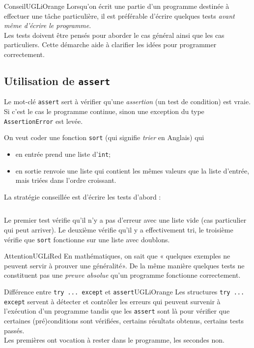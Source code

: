 \documentclass[a4paper,10pt,cours]{nsi}
\newcommand{\file}[1]{\inputminted{python}{#1}}
\begin{document}
\begin{encadrecolore}{Conseil}{UGLiOrange}
    Lorsqu'on écrit une partie d'un programme destinée à effectuer une tâche particulière, il est préférable d'écrire quelques tests \textit{avant même d'écrire le programme}.\\
    Les tests doivent être pensés pour aborder le cas général ainsi que les cas particuliers. Cette démarche aide à clarifier les idées pour programmer correctement.
\end{encadrecolore}

\subsection{Utilisation de \texttt{assert}}

Le mot-clé \texttt{assert} sert à vérifier qu'une \textit{assertion} (un test de condition) est vraie. Si c'est le cas le programme continue, sinon une exception du type \texttt{AssertionError} est levée.

On veut coder une fonction \texttt{sort} (qui signifie \textit{trier} en Anglais) qui 
\begin{itemize}
    \item   en entrée prend une liste d'\texttt{int};
    \item   en sortie renvoie une liste qui contient les mêmes valeurs que la liste d'entrée, mais triées dans l'ordre croissant.
\end{itemize}

La stratégie conseillée est d'écrire les tests d'abord :
\begin{pyc}
\file{scripts/assert2.py}
\end{pyc}
Le premier test vérifie qu'il n'y a pas d'erreur avec une liste vide (cas particulier qui peut arriver). Le deuxième vérifie qu'il y a effectivement tri, le troisième vérifie que \texttt{sort} fonctionne sur une liste avec doublons.

\begin{encadrecolore}{Attention}{UGLiRed}
    En mathématiques, on sait que « quelques exemples ne peuvent servir à prouver une généralité». De la même manière quelques tests ne constituent pas une \textit{preuve absolue} qu'un programme fonctionne correctement.
\end{encadrecolore}


\begin{encadrecolore}{Différence entre \texttt{try ... except} et \texttt{assert}}{UGLiOrange}
    Les structures \texttt{try ... except} servent à détecter et contrôler les erreurs qui peuvent survenir à l'exécution d'un programme tandis que les \texttt{assert} sont là pour vérifier que certaines (pré)conditions sont vérifiées, certains résultats obtenus, certains tests passés.\\
    Les premières ont vocation à rester dans le programme, les secondes non.
\end{encadrecolore}
\end{document}
